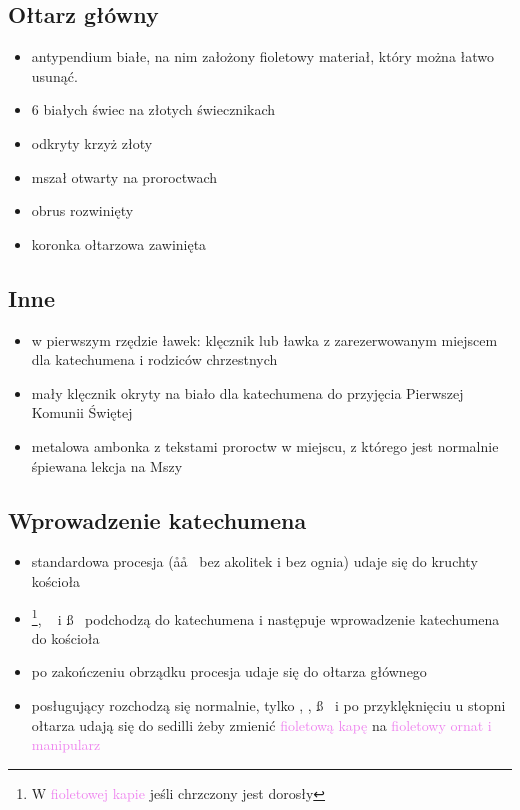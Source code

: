 \subsection{Ołtarz główny}
\begin{itemize}
	\item antypendium białe, na nim założony {\color{violet}fioletowy} materiał,
	      który można łatwo usunąć.
	\item 6 białych świec na złotych świecznikach
	\item odkryty krzyż złoty
	\item mszał otwarty na proroctwach
	\item obrus rozwinięty
	\item koronka ołtarzowa zawinięta
\end{itemize}

\subsection{Inne}
\begin{itemize}
	\item w pierwszym rzędzie ławek: klęcznik lub ławka z zarezerwowanym
	      miejscem dla katechumena i rodziców chrzestnych
	\item mały klęcznik okryty na biało dla katechumena do przyjęcia Pierwszej
	      Komunii Świętej
	\item metalowa ambonka z tekstami proroctw w miejscu, z którego jest
	      normalnie śpiewana lekcja na Mszy
\end{itemize}

\hrulefill

\subsection{Wprowadzenie katechumena}
\begin{itemize}
	\item standardowa procesja (\aa\aa~ bez akolitek i bez ognia) udaje się do
	      kruchty kościoła
	\item \ii \footnote{W \textcolor{violet}{fioletowej kapie} jeśli chrzczony
		      jest dorosły}, \dd~ i \ss~ podchodzą do katechumena i następuje
	      wprowadzenie katechumena do kościoła
	\item po zakończeniu obrządku procesja udaje się do ołtarza głównego
	\item posługujący rozchodzą się normalnie, tylko \ii, \dd, \ss~ i  po
	      przyklęknięciu u stopni ołtarza udają się do sedilli żeby zmienić
	      \textcolor{violet}{fioletową kapę} na
		  \textcolor{violet}{fioletowy ornat i manipularz}
\end{itemize}

\hrulefill


